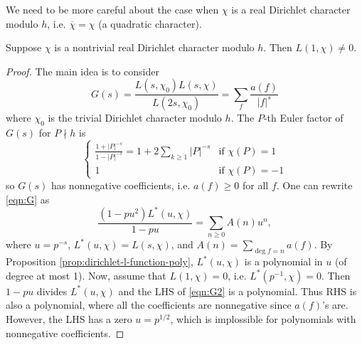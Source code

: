 We need to be more careful about the case when $\chi$ is a real Dirichlet character modulo $h$, i.e. $\overline{\chi} = \chi$ (a quadratic character).
\begin{lemma}
    Suppose $\chi$ is a nontrivial real Dirichlet character modulo $h$.
    Then $L(1, \chi) \ne 0$.
\end{lemma}
\begin{proof}
    The main idea is to consider
    \begin{equation}
    \label{eqn:G}
    G(s) = \frac{L(s, \chi_0) L(s, \chi)}{L(2s, \chi_0)} = \sum_{f} \frac{a(f)}{|f|^{s}}
    \end{equation}
    where $\chi_0$ is the trivial Dirichlet character modulo $h$.
    The $P$-th Euler factor of $G(s)$ for $P \nmid h$ is
    \[
    \begin{cases}
        \frac{1 + |P|^{-s}}{1 - |P|^{-s}} = 1 + 2 \sum_{k \ge 1} |P|^{-s} & \text{if }\chi(P) = 1 \\
        1 & \text{if }\chi(P) = -1
    \end{cases}
    \]
    so $G(s)$ has nonnegative coefficients, i.e. $a(f) \ge 0$ for all $f$.
    One can rewrite \eqref{eqn:G} as
    \begin{equation}
        \frac{(1 - pu^2) L^\ast(u, \chi)}{1 - pu} = \sum_{n \ge 0} A(n) u^n,
        \label{eqn:G2}
    \end{equation}
    where $u = p^{-s}$, $L^\ast(u, \chi) = L(s, \chi)$, and $A(n) = \sum_{\deg f = n} a(f)$.
    By Proposition \ref{prop:dirichlet-l-function-poly}, $L^\ast(u, \chi)$ is a polynomial in $u$ (of degree at most 1).
    Now, assume that $L(1, \chi) = 0$, i.e. $L^\ast(p^{-1}, \chi) = 0$.
    Then $1 - pu$ divides $L^\ast(u, \chi)$ and the LHS of \eqref{eqn:G2} is a polynomial.
    Thus RHS is also a polynomial, where all the coefficients are nonnegative since $a(f)$'s are.
    However, the LHS has a zero $u = p^{1/2}$, which is implossible for polynomials with nonnegative coefficients.
\end{proof}

